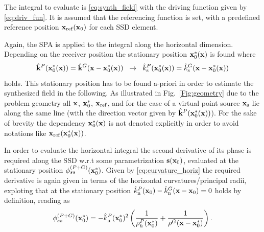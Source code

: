 \documentclass[lettersize,journal]{IEEEtran}
\begin{document}
The integral to evaluate is \eqref{eq:synth_field} with the driving function given by \eqref{eq:driv_fun}.
It is assumed that the referencing function is set, with a predefined reference position $\mathbf{x}_{\mathrm{ref}}(\mathbf{x}_0)$ for each SSD element.

Again, the SPA is applied to the integral along the horizontal dimension.
Depending on the receiver position the stationary position $\mathbf{x}_0^*(\mathbf{x})$ is found where 
\begin{equation}
  \small
  \hat{\mathbf{k}}^P(\mathbf{x}_0^*(\mathbf{x})) = \hat{\mathbf{k}}^G(\mathbf{x}-\mathbf{x}_0^*(\mathbf{x})) \hspace{2mm} \rightarrow \hspace{2mm} \hat{k}_\mathrm{s}^P(\mathbf{x}_0^*(\mathbf{x})) = \hat{k}_\mathrm{s}^G(\mathbf{x}-\mathbf{x}_0^*(\mathbf{x}))
\end{equation}
holds. 
This stationary position has to be found a-priori in order to estimate the synthesized field in the following.
As illustrated in Fig.~\ref{Fig:geometry} due to the problem geometry all $\mathbf{x}$, $\mathbf{x}_0^*$, $\mathbf{x}_{\mathrm{ref}}$, and for the case of a virtual point source $\mathbf{x}_{\mathrm{s}}$ lie along the same line (with the direction vector given by $\hat{\mathbf{k}}^P(\mathbf{x}_0^*(\mathbf{x}))$).
For the sake of brevity the dependency $\mathbf{x}_0^*(\mathbf{x})$ is not denoted explicitly in order to avoid notations like $\mathbf{x}_{\mathrm{ref}}(\mathbf{x}_0^*(\mathbf{x}))$.

In order to evaluate the horizontal integral the second derivative of its phase is required along the SSD w.r.t some parametrization $\mathbf{s}(\mathbf{x}_0)$, evaluated at the stationary position $\phi^{(P+G)}_{ss}(\mathbf{x}_0^*)$.
Given by \eqref{eq:curvature_horiz} the required derivative is again given in terms of the horizontal curvatures/principal radii, exploting that at the stationary position $\hat{k}^P_{\mathrm{n}}(\mathbf{x}_0) - \hat{k}^G_{\mathrm{n}}(\mathbf{x}-\mathbf{x}_0) = 0$ holds by definition, reading as
{\fontsize{9pt}{\baselineskip}
\selectfont
\begin{multline}
  \phi^{(P+G)}_{ss}(\mathbf{x}_0^*) = 
   -\hat{k}^P_{\mathrm{n}}(\mathbf{x}_0^*)^2\left(\frac{1}{\rho^P_h(\mathbf{x}_0^*)} + \frac{1}{\rho^G(\mathbf{x}-\mathbf{x}_0^*)}\right).
   \label{eq:tangent_plane}
\end{multline}}
\end{document}
